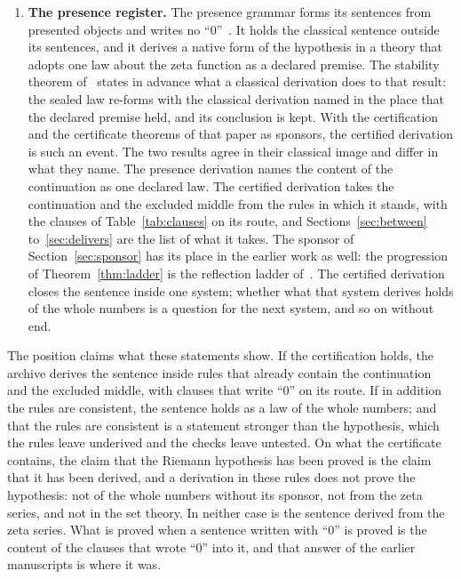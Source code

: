 \documentclass[11pt]{article}
\theoremstyle{definition}
\theoremstyle{remark}
\begin{document}
\begin{enumerate}[leftmargin=2em,itemsep=4pt]
\item \textbf{The presence register.} The presence grammar forms its sentences from presented objects and writes no ``0''~\citep{az,rhp}. It holds the classical sentence outside its sentences, and it derives a native form of the hypothesis in a theory that adopts one law about the zeta function as a declared premise. The stability theorem of~\citet{rhp} states in advance what a classical derivation does to that result: the sealed law re-forms with the classical derivation named in the place that the declared premise held, and its conclusion is kept. With the certification and the certificate theorems of that paper as sponsors, the certified derivation is such an event. The two results agree in their classical image and differ in what they name. The presence derivation names the content of the continuation as one declared law. The certified derivation takes the continuation and the excluded middle from the rules in which it stands, with the clauses of Table~\ref{tab:clauses} on its route, and Sections~\ref{sec:between} to~\ref{sec:delivers} are the list of what it takes. The sponsor of Section~\ref{sec:sponsor} has its place in the earlier work as well: the progression of Theorem~\ref{thm:ladder} is the reflection ladder of~\citet{metatheory}. The certified derivation closes the sentence inside one system; whether what that system derives holds of the whole numbers is a question for the next system, and so on without end.
\end{enumerate}

The position claims what these statements show. If the certification holds, the archive derives the sentence inside rules that already contain the continuation and the excluded middle, with clauses that write ``0'' on its route. If in addition the rules are consistent, the sentence holds as a law of the whole numbers; and that the rules are consistent is a statement stronger than the hypothesis, which the rules leave underived and the checks leave untested. On what the certificate contains, the claim that the Riemann hypothesis has been proved is the claim that it has been derived, and a derivation in these rules does not prove the hypothesis: not of the whole numbers without its sponsor, not from the zeta series, and not in the set theory. In neither case is the sentence derived from the zeta series. What is proved when a sentence written with ``0'' is proved is the content of the clauses that wrote ``0'' into it, and that answer of the earlier manuscripts is where it was.
\end{document}
